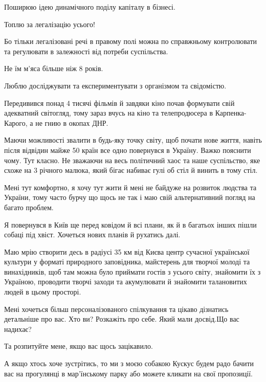 Поширюю ідею динамічного поділу капіталу в бізнесі.

Топлю за легалізацію усього!

 Бо тільки легалізовані речі в правому полі можна по справжньому контролювати
та регулювати в залежності від потреби суспільства.

Не їм м’яса більше ніж 8 років.

Люблю досліджувати та експериментувати з організмом та свідомістю.

Передивився понад 4 тисячі фільмів й завдяки кіно почав формувати свій
адекватний світогляд, тому зараз вчусь на кіно та телепродюсера в
Карпенка-Карого, а не гнию в окопах ДНР.

Маючи можливості звалити в будь-яку точку світу, щоб почати нове життя, навіть
після відвідин майже 50 країн все одно повернувся в Україну. Важко пояснити
чому. Тут класно. Не зважаючи на весь політичний хаос та наше суспільство, яке
схоже на 3 річного малюка, який бігає набиває гулі об стіл й винить в тому
стіл.

Мені тут комфортно, я хочу тут жити й мені не байдуже на розвиток людства та
України, тому часто бурчу що щось не так і маю свій альтернативний погляд на
багато проблем.

Я повернувся в Київ ще перед ковідом й всі плани, як й в багатьох інших пішли
собаці під хвіст. Хочеться нових планів й рухатись далі.

Маю мрію створити десь в радіусі 35 км від Києва центр сучасної української
культури у форматі природного заповідника, майстерень для творчої молоді та
винахідників, щоб там можна було приймати гостів з усього світу, знайомити їх з
Україною, проводити творчі заходи та акумулювати й знайомити талановитих людей
в цьому просторі.

Мені хочеться більш персоналізованого спілкування та цікаво дізнатись
детальніше про вас. Хто ви? Розкажіть про себе. Який мали досвід.Що вас
надихає?

Та розпитуйте мене, якщо вас щось зацікавило.

А якщо хтось хоче зустрітись, то ми з моєю собакою Кускус будем радо бачити вас
на прогулянці в мар’їнському парку або можете кликати на свої пропозиції.
